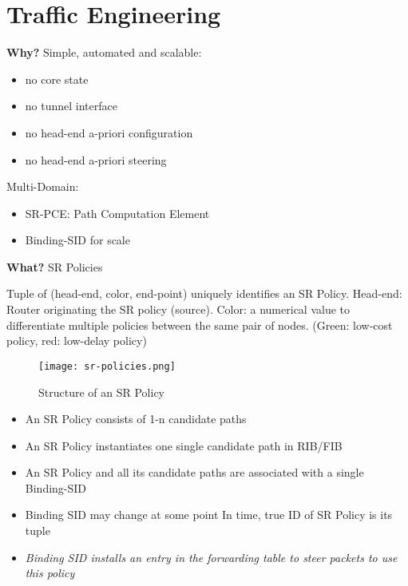 \section{Traffic Engineering}
\label{chapter:srte}

\textbf{Why?} Simple, automated and scalable:
\begin{itemize}
    \item no core state
    \item no tunnel interface
    \item no head-end a-priori configuration
    \item no head-end a-priori steering
\end{itemize}

\noindent
Multi-Domain:
\begin{itemize}
    \item SR-PCE: Path Computation Element
    \item Binding-SID for scale
\end{itemize}

\noindent
\textbf{What?} SR Policies

Tuple of \ttfamily (head-end, color, end-point) \rmfamily uniquely identifies an SR Policy.
Head-end: Router originating the SR policy (source).
Color: a numerical value to differentiate multiple policies between the same pair of nodes. (Green: low-cost policy, red: low-delay policy)

\begin{figure}[h]
    \texttt{[image: sr-policies.png]}
    \caption{Structure of an SR Policy}
\end{figure}

\begin{itemize}
    \item An SR Policy consists of 1-n candidate paths
    \item An SR Policy instantiates one single candidate path in RIB/FIB 
    \item An SR Policy and all its candidate paths are associated with a single Binding-SID
    \item Binding SID may change at  some point In time, true ID of SR Policy is its tuple
    \item \emph{Binding SID installs an entry in the forwarding table to steer packets to use this policy}
\end{itemize}

